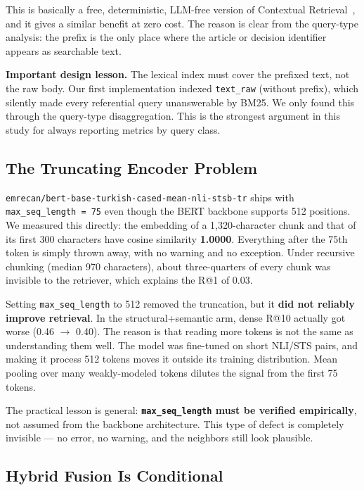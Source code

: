 \documentclass[11pt,a4paper,twocolumn]{article}
\begin{document}
This is basically a free, deterministic, LLM-free version of Contextual Retrieval~\cite{anthropic2024}, and it gives a similar benefit at zero cost. The reason is clear from the query-type analysis: the prefix is the only place where the article or decision identifier appears as searchable text.

\textbf{Important design lesson.} The lexical index must cover the prefixed text, not the raw body. Our first implementation indexed \texttt{text\_raw} (without prefix), which silently made every referential query unanswerable by BM25. We only found this through the query-type disaggregation. This is the strongest argument in this study for always reporting metrics by query class.

\subsection{The Truncating Encoder Problem}

\texttt{emrecan/bert-base-turkish-cased-mean-nli-stsb-tr} ships with \texttt{max\_seq\_length\,=\,75} even though the BERT backbone supports 512 positions. We measured this directly: the embedding of a 1,320-character chunk and that of its first 300 characters have cosine similarity \textbf{1.0000}. Everything after the 75th token is simply thrown away, with no warning and no exception. Under recursive chunking (median 970 characters), about three-quarters of every chunk was invisible to the retriever, which explains the R@1 of 0.03.

Setting \texttt{max\_seq\_length} to 512 removed the truncation, but it \textbf{did not reliably improve retrieval}. In the structural+semantic arm, dense R@10 actually got worse (0.46 $\rightarrow$ 0.40). The reason is that reading more tokens is not the same as understanding them well. The model was fine-tuned on short NLI/STS pairs, and making it process 512 tokens moves it outside its training distribution. Mean pooling over many weakly-modeled tokens dilutes the signal from the first 75 tokens.

The practical lesson is general: \textbf{\texttt{max\_seq\_length} must be verified empirically}, not assumed from the backbone architecture. This type of defect is completely invisible --- no error, no warning, and the neighbors still look plausible.

\subsection{Hybrid Fusion Is Conditional}
\end{document}
